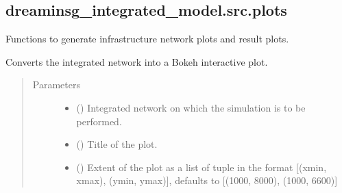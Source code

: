 \documentclass[letterpaper,10pt,english]{sphinxmanual}
\begin{document}
\subsection{dreaminsg\_integrated\_model.src.plots}
\label{\detokenize{apidoc:module-dreaminsg_integrated_model.src.plots}}\label{\detokenize{apidoc:dreaminsg-integrated-model-src-plots}}
\sphinxAtStartPar
Functions to generate infrastructure network plots and result plots.

\begin{fulllineitems}
\label{\detokenize{apidoc:dreaminsg_integrated_model.src.plots.plot_bokeh_from_integrated_graph}}
\sphinxAtStartPar
Converts the integrated network into a Bokeh interactive plot.
\begin{quote}\begin{description}
\item[{Parameters}] \leavevmode\begin{itemize}
\item {} 
\sphinxAtStartPar
{} () \textendash{} Integrated network on which the simulation is to be performed.

\item {} 
\sphinxAtStartPar
{} () \textendash{} Title of the plot.

\item {} 
\sphinxAtStartPar
{} (\sphinxstyleliteralemphasis{\sphinxupquote{, }}) \textendash{} Extent of the plot as a list of tuple in the format {[}(xmin, xmax), (ymin, ymax){]}, defaults to {[}(1000, 8000), (1000, 6600){]}

\end{itemize}

\end{description}\end{quote}

\end{fulllineitems}
\end{document}
